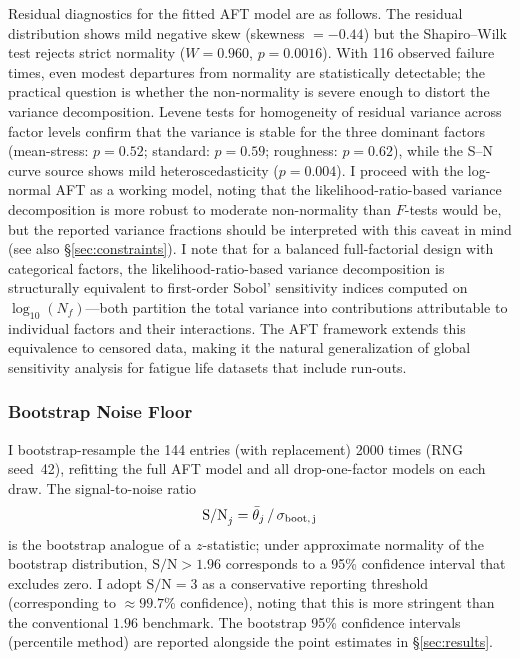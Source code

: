 \documentclass[12pt,a4paper]{article}
\begin{document}
Residual diagnostics for the fitted AFT model are as follows.
The residual distribution shows mild negative skew (skewness
$=-0.44$) but the Shapiro--Wilk test rejects strict normality
($W=0.960$, $p=0.0016$). With 116 observed failure times, even
modest departures from normality are statistically detectable;
the practical question is whether the non-normality is severe
enough to distort the variance decomposition. Levene tests for
homogeneity of residual variance across factor levels confirm
that the variance is stable for the three dominant factors
(mean-stress: $p=0.52$; standard: $p=0.59$; roughness:
$p=0.62$), while the S--N curve source shows mild
heteroscedasticity ($p=0.004$). I proceed with the log-normal
AFT as a working model, noting that the likelihood-ratio-based
variance decomposition is more robust to moderate non-normality
than $F$-tests would be, but the reported variance fractions
should be interpreted with this caveat in mind (see also
\S\ref{sec:constraints}). I note that for a balanced full-factorial
design with categorical factors, the likelihood-ratio-based variance
decomposition is structurally equivalent to first-order Sobol'
sensitivity indices computed on $\log_{10}(N_f)$---both partition the
total variance into contributions attributable to individual factors
and their interactions. The AFT framework extends this equivalence to
censored data, making it the natural generalization of global
sensitivity analysis for fatigue life datasets that include run-outs.

\subsubsection{Bootstrap Noise Floor}

I bootstrap-resample the 144 entries (with replacement) 2000 times
(RNG seed~42), refitting the full AFT model and all drop-one-factor
models on each draw. The signal-to-noise ratio
\begin{equation}
\mathrm{S/N}_j = \bar{\theta}_j \,/\, \sigma_{\rm boot,\,j}
\label{eq:snr}
\end{equation}
is the
bootstrap analogue of a $z$-statistic; under approximate normality
of the bootstrap distribution, $\mathrm{S/N} > 1.96$ corresponds to
a 95\% confidence interval that excludes zero. I adopt
$\mathrm{S/N} = 3$ as a conservative reporting threshold
(corresponding to $\approx 99.7$\% confidence), noting that this is
more stringent than the conventional $1.96$ benchmark. The bootstrap
95\% confidence intervals (percentile method) are reported alongside
the point estimates in \S\ref{sec:results}.
\end{document}
